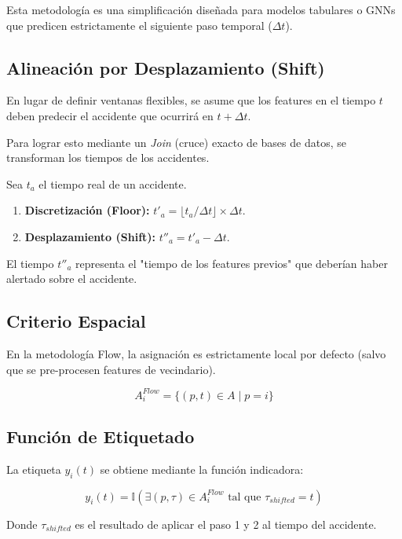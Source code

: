 \documentclass[11pt, letterpaper]{article}
\begin{document}
Esta metodología es una simplificación diseñada para modelos tabulares o GNNs que predicen estrictamente el siguiente paso temporal ($\Delta t$).

\subsection{Alineación por Desplazamiento (Shift)}
En lugar de definir ventanas flexibles, se asume que los features en el tiempo $t$ deben predecir el accidente que ocurrirá en $t + \Delta t$.

Para lograr esto mediante un \textit{Join} (cruce) exacto de bases de datos, se transforman los tiempos de los accidentes.

Sea $t_a$ el tiempo real de un accidente.
\begin{enumerate}
    \item \textbf{Discretización (Floor):} $t'_{a} = \lfloor t_a / \Delta t \rfloor \times \Delta t$.
    \item \textbf{Desplazamiento (Shift):} $t''_{a} = t'_{a} - \Delta t$.
\end{enumerate}

El tiempo $t''_{a}$ representa el "tiempo de los features previos" que deberían haber alertado sobre el accidente.

\subsection{Criterio Espacial}
En la metodología Flow, la asignación es estrictamente local por defecto (salvo que se pre-procesen features de vecindario).

\begin{equation}
    A^{Flow}_i = \{ (p, t) \in A \mid p = i \}
\end{equation}

\subsection{Función de Etiquetado}
La etiqueta $y_i(t)$ se obtiene mediante la función indicadora:

\begin{equation}
    y_i(t) = \mathbb{I}\left( \exists (p, \tau) \in A^{Flow}_i \text{ tal que } \tau_{shifted} = t \right)
\end{equation}

Donde $\tau_{shifted}$ es el resultado de aplicar el paso 1 y 2 al tiempo del accidente.
\end{document}
